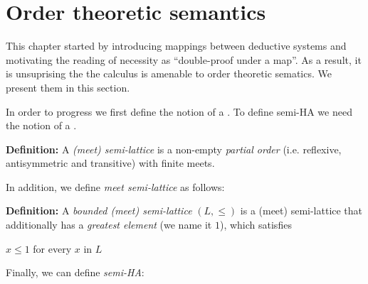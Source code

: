 			
			
			
			
			\section{Order theoretic semantics}
			This chapter started by introducing 
			mappings between deductive systems and 
			motivating the reading of necessity as ``double-proof under a map''.
			As a result, it is unsuprising the the calculus is amenable to order theoretic sematics.
			We present them in this section.

			In order to progress we first define the notion of a 
			. 
			To define semi-HA we need the notion of a .
			  
			
			\begin{mdframed}
			\textbf{Definition:}
			A \textit{(meet) semi-lattice} is a non-empty \emph{partial order} (i.e. reflexive, antisymmetric and transitive) 
			with finite meets.
			\end{mdframed}
			In addition, we define \emph{meet semi-lattice} as follows: 
			\begin{mdframed}
			\textbf{Definition:}
			A \textit{bounded (meet) semi-lattice} $(L,\le)$ is a (meet) 
			semi-lattice that additionally has 
			a \emph{greatest element} (we name it $1$), which satisfies
			
			$x \le 1$ for every $x$ in $L$
			\end{mdframed}
			Finally, we can define \emph{semi-HA}:
			
